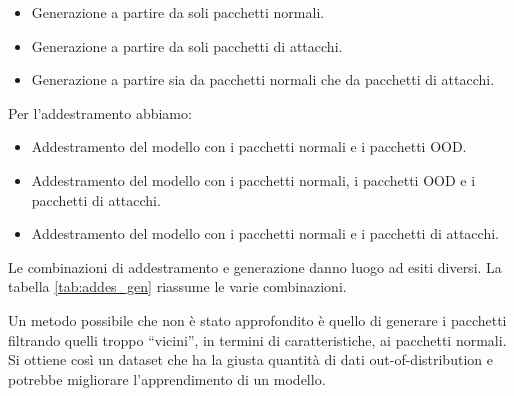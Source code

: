 \begin{itemize}
  \item Generazione a partire da soli pacchetti normali.
  \item Generazione a partire da soli pacchetti di attacchi.
  \item Generazione a partire sia da pacchetti normali che da pacchetti di attacchi.
\end{itemize}

Per l'addestramento abbiamo:

\begin{itemize}
  \item Addestramento del modello con i pacchetti normali e i pacchetti OOD.
  \item Addestramento del modello con i pacchetti normali, i pacchetti OOD e i pacchetti di attacchi.
  \item Addestramento del modello con i pacchetti normali e i pacchetti di attacchi.
\end{itemize}

Le combinazioni di addestramento e generazione danno luogo ad esiti diversi. La tabella \ref{tab:addes_gen} riassume le varie combinazioni.

\begin{table}\centering\setlength\tabcolsep{3.5pt}\renewcommand{}
  \noindent{}%
\caption{\label{tab:addes_gen} Combinazioni di generazione dei pacchetti e addestramento del modello, dove N = pacchetti normali, AV = pacchetti di attacchi veri, OOD = pacchetti generati. Si trova poi AV OOD, N OOD, N+AV OOD, rispettivamente dati generati a partire da attacchi, dati generati a partire da pacchetti normali, dati generati a partire dal dataset completo}
\end{table}


Un metodo possibile che non è stato approfondito è quello di generare i pacchetti filtrando quelli troppo ``vicini'', in termini di caratteristiche, ai pacchetti normali. Si ottiene così un dataset che ha la giusta quantità di dati out-of-distribution e potrebbe migliorare l'apprendimento di un modello.

